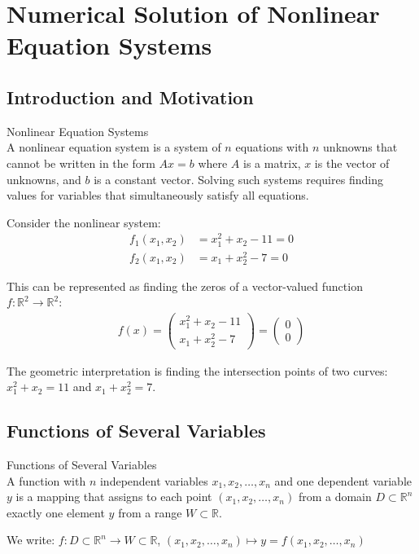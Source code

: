 

\section{Numerical Solution of Nonlinear Equation Systems}

\subsection{Introduction and Motivation}

\begin{definition}{Nonlinear Equation Systems}\\
A nonlinear equation system is a system of $n$ equations with $n$ unknowns that cannot be written in the form $Ax = b$ where $A$ is a matrix, $x$ is the vector of unknowns, and $b$ is a constant vector. Solving such systems requires finding values for variables that simultaneously satisfy all equations.
\end{definition}

\begin{example}
Consider the nonlinear system:
\begin{align*}
f_1(x_1, x_2) &= x_1^2 + x_2 - 11 = 0\\
f_2(x_1, x_2) &= x_1 + x_2^2 - 7 = 0
\end{align*}

This can be represented as finding the zeros of a vector-valued function $f: \mathbb{R}^2 \rightarrow \mathbb{R}^2$:
\begin{align*}
f(x) = \begin{pmatrix} x_1^2 + x_2 - 11 \\ x_1 + x_2^2 - 7 \end{pmatrix} = \begin{pmatrix} 0 \\ 0 \end{pmatrix}
\end{align*}

The geometric interpretation is finding the intersection points of two curves: $x_1^2 + x_2 = 11$ and $x_1 + x_2^2 = 7$.
\end{example}

\subsection{Functions of Several Variables}

\begin{definition}{Functions of Several Variables}\\
A function with $n$ independent variables $x_1, x_2, \ldots, x_n$ and one dependent variable $y$ is a mapping that assigns to each point $(x_1, x_2, \ldots, x_n)$ from a domain $D \subset \mathbb{R}^n$ exactly one element $y$ from a range $W \subset \mathbb{R}$.

We write: $f: D \subset \mathbb{R}^n \rightarrow W \subset \mathbb{R}$, $(x_1, x_2, \ldots, x_n) \mapsto y = f(x_1, x_2, \ldots, x_n)$
\end{definition}

